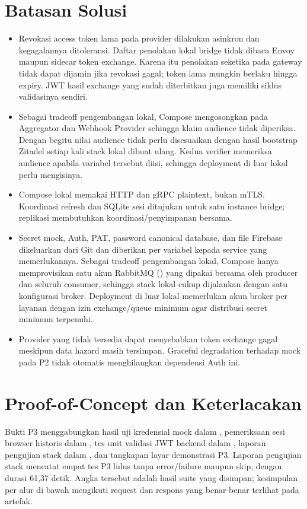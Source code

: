 \section{Batasan Solusi}
\begin{itemize}
\item Revokasi access token lama pada provider dilakukan asinkron dan kegagalannya ditoleransi. Daftar penolakan lokal bridge tidak dibaca Envoy maupun sidecar token exchange. Karena itu penolakan seketika pada gateway tidak dapat dijamin jika revokasi gagal; token lama mungkin berlaku hingga expiry. JWT hasil exchange yang sudah diterbitkan juga memiliki siklus validasinya sendiri.
\item Sebagai tradeoff pengembangan lokal, Compose mengosongkan  pada Aggregator dan Webhook Provider sehingga klaim audience tidak diperiksa. Dengan begitu nilai audience tidak perlu disesuaikan dengan hasil bootstrap Zitadel setiap kali stack lokal dibuat ulang. Kedua verifier memeriksa audience apabila variabel tersebut diisi, sehingga deployment di luar lokal perlu mengisinya.
\item Compose lokal memakai HTTP dan gRPC plaintext, bukan mTLS. Koordinasi refresh dan SQLite sesi ditujukan untuk satu instance bridge; replikasi membutuhkan koordinasi/penyimpanan bersama.
\item Secret mock, Auth, PAT, password canonical database, dan file Firebase dikeluarkan dari Git dan diberikan per variabel kepada service yang memerlukannya. Sebagai tradeoff pengembangan lokal, Compose hanya memprovisikan satu akun RabbitMQ () yang dipakai bersama oleh producer dan seluruh consumer, sehingga stack lokal cukup dijalankan dengan satu konfigurasi broker. Deployment di luar lokal memerlukan akun broker per layanan dengan izin exchange/queue minimum agar distribusi secret minimum terpenuhi.
\item Provider yang tidak tersedia dapat menyebabkan token exchange gagal meskipun data hazard masih tersimpan. Graceful degradation terhadap mock pada P2 tidak otomatis menghilangkan dependensi Auth ini.
\end{itemize}

\section{Proof-of-Concept dan Keterlacakan}
Bukti P3 menggabungkan hasil uji kredensial mock dalam , pemeriksaan sesi browser historis dalam , tes unit validasi JWT backend dalam , laporan pengujian stack dalam , dan tangkapan layar demonstrasi P3. Laporan pengujian stack mencatat empat tes P3 lulus tanpa error/failure maupun skip, dengan durasi 61,37 detik. Angka tersebut adalah hasil suite yang disimpan; kesimpulan per alur di bawah mengikuti request dan respons yang benar-benar terlihat pada artefak.

